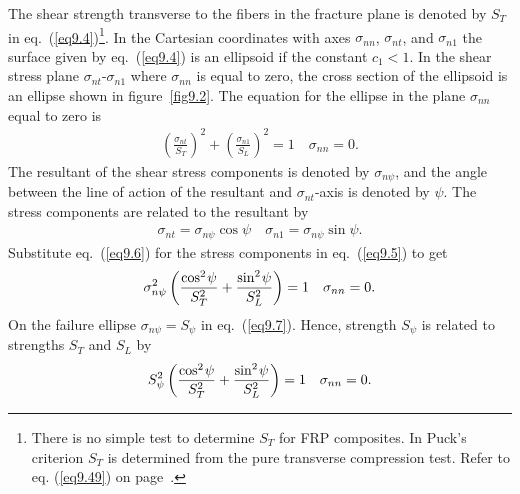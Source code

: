 \documentclass{AeroStructure-ERJohnson}
\begin{document}
\noindent The shear strength transverse to the fibers in the fracture plane is denoted by $S_T$ in eq.~(\ref{eq9.4})\footnote{There is no simple test to determine $S_T$ for FRP composites. In Puck's criterion $S_T$ is determined from the pure transverse compression test. Refer to eq. (\ref{eq9.49}) on page~\pageref{eq9.49}.}. In the Cartesian coordinates with axes $\sigma_\textit{nn}$, $\sigma_\textit{nt}$, and $\sigma_{n1}$ the surface given by eq.~(\ref{eq9.4}) is an ellipsoid if the constant $c_1 < 1$. In the shear stress plane $\sigma_\textit{nt}$-$\sigma_{n1}$ where $\sigma_\textit{nn}$ is equal to zero, the cross section of the ellipsoid is an ellipse shown in figure~\ref{fig9.2}. The equation for the ellipse in the plane $\sigma_\textit{nn}$ equal to zero is
\begin{align}\label{eq9.5}
\left(\frac{\sigma_{n t}}{S_{T}}\right)^{2}+\left(\frac{\sigma_{n 1}}{S_{L}}\right)^{2}=1 \quad \sigma_{n n}=0.
\end{align}
The resultant of the shear stress components is denoted by $\sigma_{n\psi}$, and the angle between the line of action of the resultant and $\sigma_\textit{nt}$-axis is denoted by $\psi$. The stress components are related to the resultant by
\begin{align}\label{eq9.6}
\sigma_{n t}=\sigma_{n\psi} \cos \psi \quad \sigma_{n 1}=\sigma_{n \psi} \sin \psi.
\end{align}
Substitute eq.~(\ref{eq9.6}) for the stress components in eq.~(\ref{eq9.5}) to get
\begin{align}\label{eq9.7}
\sigma_{n \psi}^{2}\left(\frac{\cos ^{2}{\kern-1pt\psi}}{S_{T}^{2}}+\frac{\sin ^{2}{\kern-1pt\psi}}{S_{L}^{2}}\right)=1 \quad \sigma_{n n}=0.
\end{align}
On the failure ellipse $\sigma_{n \psi}=S_{\psi}$ in eq.~(\ref{eq9.7}). Hence, strength $S_{\psi}$ is related to strengths $S_T$ and  $S_L$ by
\begin{align}\label{eq9.8}
S_{\psi}^{2}\left(\frac{\cos ^{2}{\kern-1pt\psi}}{S_{T}^{2}}+\frac{\sin ^{2}{\kern-1pt\psi}}{S_{L}^{2}}\right)=1 \quad \sigma_{n n}=0.
\end{align}
\end{document}
